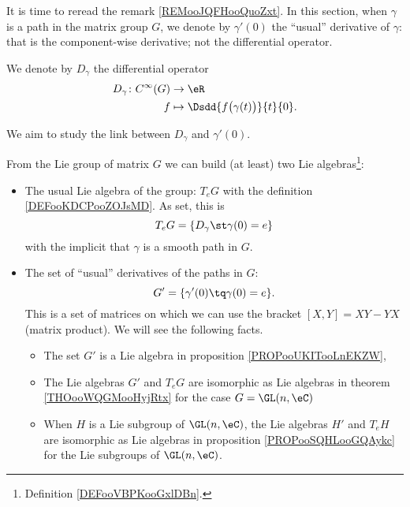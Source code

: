 \begin{normaltext}      \label{NORMooHZGKooJEiamo}
	It is time to reread the remark \ref{REMooJQFHooQuoZxt}. In this section, when \( \gamma\) is a path in the matrix group \( G\), we denote by \( \gamma'(0)\) the ``usual'' derivative of \( \gamma\): that is the component-wise derivative; not the differential operator.

	We denote by \( D_{\gamma}\) the differential operator
	\begin{equation}
		\begin{aligned}
			D_{\gamma}\colon  C^{\infty}(G) & \to \eR                                        \\
			f                               & \mapsto \Dsdd{ f\big( \gamma(t) \big) }{t}{0}.
		\end{aligned}
	\end{equation}

	We aim to study the link between \( D_{\gamma}\) and \( \gamma'(0)\).

	From the Lie group of matrix \( G\) we can build (at least) two Lie algebras\footnote{Definition \ref{DEFooVBPKooGxlDBn}.}:
	\begin{itemize}
		\item The usual Lie algebra of the group: \( T_eG\) with the definition \ref{DEFooKDCPooZOJsMD}. As set, this is
		      \begin{equation}
			      T_eG=\{ D_{\gamma}\st \gamma(0)=e \}
		      \end{equation}
		      with the implicit that \( \gamma\) is a smooth path in \( G\).
		\item
		      The set of ``usual'' derivatives of the paths in \( G\):
		      \begin{equation}
			      G'=\{ \gamma'(0)\tq \gamma(0)=e \}.
		      \end{equation}
		      This is a set of matrices on which we can use the bracket \( [X,Y]=XY-YX\) (matrix product). We will see the following facts.
		      \begin{itemize}
			      \item
			            The set \( G'\) is a Lie algebra in proposition \ref{PROPooUKITooLnEKZW},
			      \item
			            The Lie algebras \( G'\) and \( T_eG\) are isomorphic as Lie algebras in theorem \ref{THOooWQGMooHyjRtx} for the case \( G=\GL(n,\eC)\)
			      \item
			            When \( H\) is a Lie subgroup of \( \GL(n,\eC)\), the Lie algebras \( H'\) and \( T_eH\) are isomorphic as Lie algebras in proposition \ref{PROPooSQHLooGQAykc} for the Lie subgroups of \( \GL(n,\eC)\).
		      \end{itemize}
	\end{itemize}
\end{normaltext}

